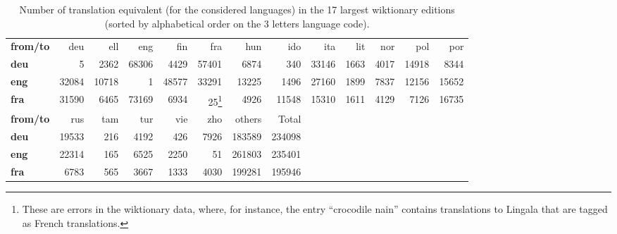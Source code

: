 \documentclass[10pt, a4paper]{article}
\begin{document}
\begin{table}[htb]
\begin{minipage}{.9\linewidth}
\begin{tabular}{lrrrrrrrrrrrr}
\textbf{from/to}  & deu & ell & eng & fin & fra & hun & ido & ita & lit & nor & pol & por \\
\textbf{deu} & 5 & 2362 & 68306 & 4429 & 57401 & 6874 & 340 & 33146 & 1663 & 4017 & 14918 & 8344 \\
\textbf{eng} & 32084 & 10718 & 1 & 48577 & 33291 & 13225 & 1496 & 27160 & 1899 & 7837 & 12156 & 15652\\
\textbf{fra} & 31590 & 6465 & 73169 & 6934 & 25\footnote{These are errors in the wiktionary data, where, for instance, the entry ``crocodile nain'' contains translations to Lingala that are tagged as French translations.} & 4926 & 11548 & 15310 & 1611 & 4129 & 7126 & 16735 \\
\hline
\textbf{from/to}  & rus & tam & tur & vie & zho& others & Total \\
\textbf{deu} & 19533 & 216 & 4192 & 426 & 7926 & 183589 & 234098\\
\textbf{eng} & 22314 & 165 & 6525 & 2250 & 51 & 261803 & 235401\\
\textbf{fra} & 6783 & 565 & 3667 & 1333 & 4030 & 199281 & 195946\\
\end{tabular}
\end{minipage}
\caption{Number of translation equivalent (for the considered languages) in the 17 largest wiktionary editions (sorted by alphabetical order on the 3 letters language code).}
\label{table:translations}
\end{table}



\end{document}

